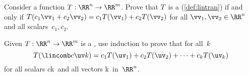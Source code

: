 \begin{exercise} \label{ex:} 
Consider a function \(T:\RR^n\to\RR^m\).  
Prove that \(T\)~is a  (\autoref{def:lintran}) if and only if \(T(c_1\vv_1+c_2\vv_2)=c_1T(\vv_1)+c_2T(\vv_2)\) for all \(\vv_1,\vv_2\in\RR^n\) and all scalars~\(c_1,c_2\).
\end{exercise}



\begin{exercise} \label{ex:genlintran} 
Given \(T:\RR^n\to\RR^m\) is a , use induction to prove that for all~\(k\)
\begin{equation*}
T(\lincomb c\uv k)
=c_1T(\uv_1)+c_2T(\uv_2)+\cdots+c_kT(\uv_k)
\end{equation*}
for all scalars \hlist ck\ and all vectors \hlist \uv k\ in~\(\RR^n\).
\end{exercise}





